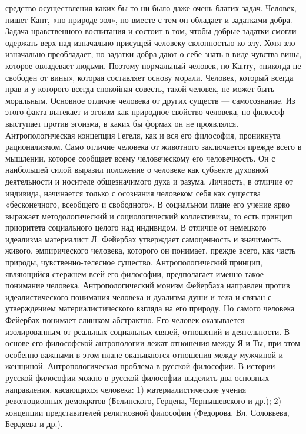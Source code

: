 \documentclass[12pt]{article}
\begin{document}
средство осуществления каких бы то ни было даже очень благих задач.
Человек, пишет Кант, «по природе зол», но вместе с тем он обладает и задатками добра. Задача нравственного
воспитания и состоит в том, чтобы добрые задатки смогли одержать верх над изначально присущей человеку
склонностью ко злу. Хотя зло изначально преобладает, но задатки добра дают о себе знать в виде чувства вины,
которое овладевает людьми. Поэтому нормальный человек, по Канту, «никогда не свободен от вины», которая
составляет основу морали. Человек, который всегда прав и у которого всегда спокойная совесть, такой человек,
не может быть моральным. Основное отличие человека от других существ — самосознание. Из этого факта
вытекает и эгоизм как природное свойство человека, но философ выступает против эгоизма, в каких бы формах
он не проявлялся.
Антропологическая концепция Гегеля, как и вся его философия, проникнута рационализмом. Само отличие
человека от животного заключается прежде всего в мышлении, которое сообщает всему человеческому его
человечность. Он с наибольшей силой выразил положение о человеке как субъекте духовной деятельности и
носителе общезначимого духа и разума. Личность, в отличие от индивида, начинается только с осознания
человеком себя как существа «бесконечного, всеобщего и свободного». В социальном плане его учение ярко
выражает методологический и социологический коллективизм, то есть принцип приоритета социального целого
над индивидом. В отличие от немецкого идеализма материалист Л. Фейербах утверждает самоценность и
значимость живого, эмпирического человека, которого он понимает, прежде всего, как часть природы,
чувственно-телесное существо. Антропологический принцип, являющийся стержнем всей его философии,
предполагает именно такое понимание человека. Антропологический монизм Фейербаха направлен против
идеалистического понимания человека и дуализма души и тела и связан с утверждением материалистического
взгляда на его природу. Но самого человека Фейербах понимает слишком абстрактно. Его человек оказывается
изолированным от реальных социальных связей, отношений и деятельности. В основе его философской
антропологии лежат отношения между Я и Ты, при этом особенно важными в этом плане оказываются
отношения между мужчиной и женщиной.
Антропологическая проблема в русской философии.
В истории русской философии можно в русской философии выделить два основных направления, касающихся
человека:
1) материалистические учения революционных демократов (Белинского, Герцена, Чернышевского и др.);
2) концепции представителей религиозной философии (Федорова, Вл. Соловьева, Бердяева и др.).
\end{document}

